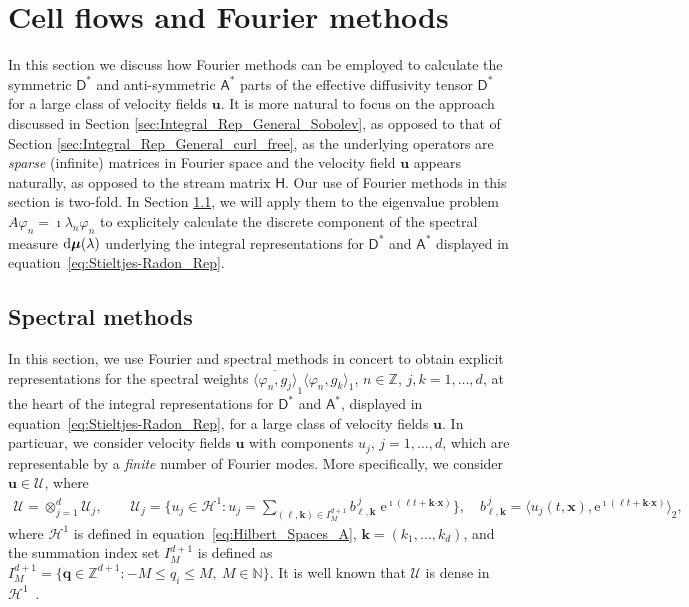 \documentclass[leqno,onefignum,onetabnum]{siamltex1213}
\newcommand{\e}{\mathrm{e}}
\renewcommand{\d}{\mathrm{d}}
\newcommand{\Uc}{\mathcal{U}}
\newcommand{\Dm}{\mathsf{D}}
\newcommand{\Hm}{\mathsf{H}}
\newcommand{\Am}{\mathsf{A}}
\newcommand{\Hs}{\mathscr{H}}
\newcommand\bmu{\mbox{\boldmath${\mu}$}}
\providecommand\bcdot{\boldsymbol{\cdot}}
\newcommand{\vecx}{\boldsymbol{x}}
\newcommand{\vecu}{\boldsymbol{u}}
\newcommand{\veck}{\boldsymbol{k}}
\newcommand{\vecq}{\boldsymbol{q}}
\begin{document}
\section{Cell flows and Fourier methods}\label{sec:Fourier_Methods}
%
In this section we discuss how Fourier methods can be employed to
calculate the symmetric $\Dm^*$ and anti-symmetric $\Am^*$
parts of the effective diffusivity tensor $\Dm^*$ for a large class
of velocity fields $\vecu $. It is more natural  to focus on the
approach discussed in Section \ref{sec:Integral_Rep_General_Sobolev},
as opposed to that of Section
\ref{sec:Integral_Rep_General_curl_free}, as the underlying operators
are \emph{sparse} (infinite) matrices in Fourier space and the 
velocity field $\vecu $ appears naturally, as opposed to the stream
matrix $\Hm$. Our use of Fourier methods in this section is
two-fold. In Section \ref{sec:Spectral_Fourier_Methods}, we will apply
them to the eigenvalue problem $A\varphi_n=\imath\lambda_n\varphi_n$
to explicitely calculate the discrete component of the spectral
measure $\d\bmu(\lambda)$ underlying the integral representations for
$\Dm^*$ and $\Am^*$ displayed in
equation~\eqref{eq:Stieltjes-Radon_Rep}.  




%
\subsection{Spectral methods}
\label{sec:Spectral_Fourier_Methods}
%
In this section, we use Fourier and spectral methods in concert to
obtain explicit representations for the spectral weights
$\overline{\langle\varphi_n,g_j\rangle}_1\langle\varphi_n,g_k\rangle_1$, $n\in\mathbb{Z}$, $j,k=1,\ldots,d$, at
the heart of the integral representations for $\Dm^*$ and
$\Am^*$, displayed in equation~\eqref{eq:Stieltjes-Radon_Rep}, for
a large class of velocity fields $\vecu $. In particuar, we consider
velocity fields $\vecu $ with components $u_j$, $j=1,\ldots,d$, which are
representable by a \emph{finite} number of Fourier modes. More
specifically, we consider $\vecu \in\Uc$, where 
%
\begin{align}\label{eq:velocity_field_space}
  \Uc=\otimes_{j=1}^d\Uc_j, \qquad
  \Uc_j=\Big\{u_j\in\Hs^1:u_j=\sum_{(\ell,\veck)\in I_M^{d+1}}b^{\,j}_{\ell,\veck}\;\e^{\imath(\ell t+\veck\bcdot\vecx)}\Big\},
   \quad
  b^{\,j}_{\ell,\veck}=\big\langle u_j(t,\vecx),\e^{\imath(\ell t+\veck\bcdot\vecx)}\big\rangle_2, 
\end{align}
%
where $\Hs^1$ is defined in equation~\eqref{eq:Hilbert_Spaces_A},
$\veck=(k_1,\ldots,k_d)$, and the summation index set $I_M^{d+1}$ is defined as
$I_M^{d+1}=\{\vecq\in\mathbb{Z}^{d+1}:-M\leq q_i\leq M, \ M\in\mathbb{N}\}$. It is well
known that $\Uc$ is dense in $\Hs^1$~\cite{Folland:99:RealAnalysis}. 
\end{document}
